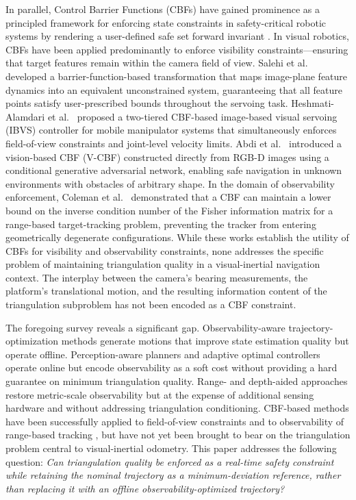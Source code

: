 \documentclass[journal]{IEEEtran}
\begin{document}
In parallel, Control Barrier Functions (CBFs) have gained prominence as a principled framework for enforcing state constraints in safety-critical robotic systems by rendering a user-defined safe set forward invariant \cite{ames}. In visual robotics, CBFs have been applied predominantly to enforce visibility constraints---ensuring that target features remain within the camera field of view. Salehi et al.\ \cite{salehi2021cbfibvs} developed a barrier-function-based transformation that maps image-plane feature dynamics into an equivalent unconstrained system, guaranteeing that all feature points satisfy user-prescribed bounds throughout the servoing task. Heshmati-Alamdari et al.\ \cite{heshmati2024cbfmms} proposed a two-tiered CBF-based image-based visual servoing (IBVS) controller for mobile manipulator systems that simultaneously enforces field-of-view constraints and joint-level velocity limits. Abdi et al.\ \cite{abdi2023vcbf} introduced a vision-based CBF (V-CBF) constructed directly from RGB-D images using a conditional generative adversarial network, enabling safe navigation in unknown environments with obstacles of arbitrary shape. In the domain of observability enforcement, Coleman et al.\ \cite{coleman2024cbfobs} demonstrated that a CBF can maintain a lower bound on the inverse condition number of the Fisher information matrix for a range-based target-tracking problem, preventing the tracker from entering geometrically degenerate configurations. While these works establish the utility of CBFs for visibility and observability constraints, none addresses the specific problem of maintaining triangulation quality in a visual-inertial navigation context. The interplay between the camera's bearing measurements, the platform's translational motion, and the resulting information content of the triangulation subproblem has not been encoded as a CBF constraint.

The foregoing survey reveals a significant gap. Observability-aware trajectory-optimization methods \cite{hausman2016obsaware, grebe2021obsaware} generate motions that improve state estimation quality but operate offline. Perception-aware planners \cite{wu2022perception} and adaptive optimal controllers \cite{ogri2024adaptive, ogri2025monocular} operate online but encode observability as a soft cost without providing a hard guarantee on minimum triangulation quality. Range- and depth-aided approaches \cite{delaune2021rangevio, alberico2024structure, xu2023novel, huo2023range, ding2023rd} restore metric-scale observability but at the expense of additional sensing hardware and without addressing triangulation conditioning. CBF-based methods have been successfully applied to field-of-view constraints \cite{salehi2021cbfibvs, heshmati2024cbfmms} and to observability of range-based tracking \cite{coleman2024cbfobs}, but have not yet been brought to bear on the triangulation problem central to visual-inertial odometry. This paper addresses the following question: \emph{Can triangulation quality be enforced as a real-time safety constraint while retaining the nominal trajectory as a minimum-deviation reference, rather than replacing it with an offline observability-optimized trajectory?}
\end{document}
